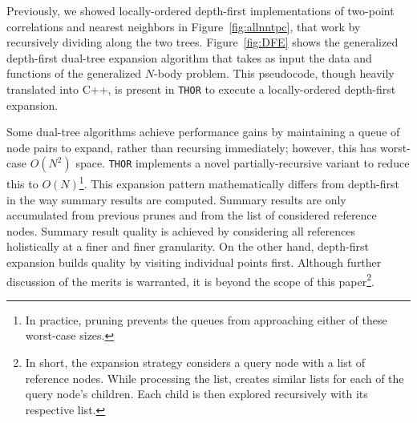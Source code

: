 \documentclass[twoside,leqno,twocolumn]{article}
\newcommand{\THOR}{{{\tt THOR}} }
\newcommand{\fig}[1]{Figure~\ref{fig:#1}}
\begin{document}
Previously, we showed locally-ordered depth-first implementations of two-point correlations and nearest neighbors in \fig{allnntpc}, that work by recursively dividing along the two trees.
\fig{DFE} shows the generalized depth-first dual-tree expansion algorithm that takes as input the data and functions of the generalized $N$-body problem.
This pseudocode, though heavily translated into C++, is present in \THOR to execute a locally-ordered depth-first expansion.

Some dual-tree algorithms achieve performance gains by maintaining a queue of node pairs to expand, rather than recursing immediately; however, this has worst-case $O(N^2)$ space.
\THOR implements a novel partially-recursive variant to reduce this to $O(N)$\footnote{
  In practice, pruning prevents the queues from approaching either of these worst-case sizes.}.
This expansion pattern mathematically differs from depth-first in the way summary results are computed.
Summary results are only accumulated from previous prunes and from the list of considered reference nodes.
Summary result quality is achieved by considering all references holistically at a finer and finer granularity.
On the other hand, depth-first expansion builds quality by visiting individual points first.
Although further discussion of the merits is warranted, it is beyond the scope of this paper\footnote{
  In short, the expansion strategy considers a query node with a list of reference nodes.
  While processing the list, creates similar lists for each of the query node's children.
  Each child is then explored recursively with its respective list.}.
\end{document}
